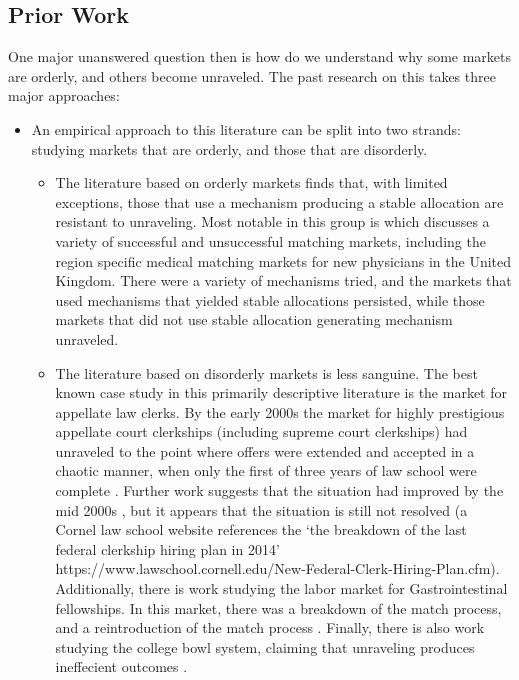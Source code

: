 \documentclass[WP]{AEA}
\begin{document}
\subsection{Prior Work}
One major unanswered question then is how do we understand why some markets are orderly, and others become unraveled.  The past research on this takes three major approaches:

\begin{itemize}
	\item An empirical approach to this literature can be split into two strands: studying markets that are orderly, and those that are disorderly. 
	\begin{itemize}
		\item The literature based on orderly markets finds that, with limited exceptions, those that use a mechanism producing a stable allocation are resistant to unraveling.  Most notable in this group is  \cite{Roth2002} which discusses a variety of successful and unsuccessful matching markets, including the region specific medical matching markets for new physicians in the United Kingdom.  There were a variety of mechanisms tried, and the markets that used mechanisms that yielded stable allocations persisted, while those markets that did not use stable allocation generating mechanism unraveled.
		\item The literature based on disorderly markets is less sanguine. The best known case study in this primarily descriptive literature is the market for appellate law clerks.  By the early 2000s the market for highly prestigious appellate court clerkships (including supreme court clerkships) had unraveled to the point where offers were extended and accepted in a chaotic manner, when only the first of three years of law school were complete \cite{Avery2001}.  Further work suggests that the situation had improved by the mid 2000s \cite{Avery2007}, but it appears that the situation is still not resolved (a Cornel law school website references the `the breakdown of the last federal clerkship hiring plan in 2014' https://www.lawschool.cornell.edu/New-Federal-Clerk-Hiring-Plan.cfm). Additionally, there is work studying the labor market for Gastrointestinal fellowships.  In this market, there was a breakdown of the match process, and a reintroduction of the match process \cite{Niederle2008,Niederle2003}.  Finally, there is also work studying the college bowl system, claiming that unraveling produces ineffecient outcomes \cite{Frechette2007}.
	\end{itemize}
	 

\end{itemize}
\end{document}

